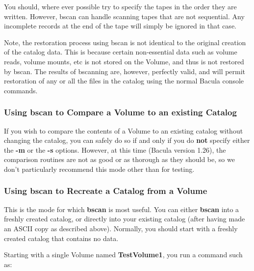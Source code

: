 You should, where ever possible try to specify the tapes in the order they are
written. However, bscan can handle scanning tapes that are not sequential. Any
incomplete records at the end of the tape will simply be ignored in that case.


Note, the restoration process using bscan is not identical to the original
creation of the catalog data. This is because certain non-essential data such
as volume reads, volume mounts, etc is not stored on the Volume, and thus is
not restored by bscan. The results of bscanning are, however, perfectly valid,
and will permit restoration of any or all the files in the catalog using the
normal Bacula console commands. 

\subsubsection*{Using bscan to Compare a Volume to an existing Catalog}

If you wish to compare the contents of a Volume to an existing catalog without
changing the catalog, you can safely do so if and only if you do {\bf not}
specify either the {\bf -m} or the {\bf -s} options. However, at this time
(Bacula version 1.26), the comparison routines are not as good or as thorough
as they should be, so we don't particularly recommend this mode other than for
testing. 

\subsubsection*{Using bscan to Recreate a Catalog from a Volume}

This is the mode for which {\bf bscan} is most useful. You can either {\bf
bscan} into a freshly created catalog, or directly into your existing catalog
(after having made an ASCII copy as described above). Normally, you should
start with a freshly created catalog that contains no data. 

Starting with a single Volume named {\bf TestVolume1}, you run a command such
as: 

